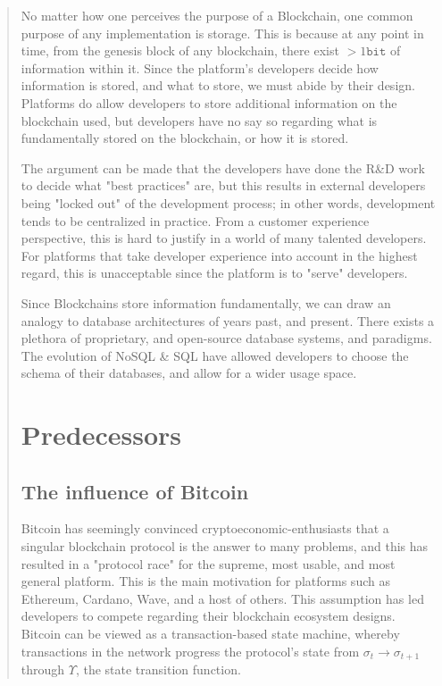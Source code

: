 \documentclass[12pt, titlepage, twocolumn]{report}
\begin{document}
\begin{quotation}
No matter how one perceives the purpose of a Blockchain, one common purpose of any implementation is storage. This is because at any point in time, from the genesis block of any blockchain, there exist \(> 1 \texttt{bit}\) of information within it. Since the platform's developers decide how information is stored, and what to store, we must abide by their design. Platforms do allow developers to store additional information on the blockchain used, but developers have no say so regarding what is fundamentally stored on the blockchain, or how it is stored. 

The argument can be made that the developers have done the R\&D work to decide what "best practices" are, but this results in external developers being "locked out" of the development process; in other words, development tends to be centralized in practice. From a customer experience perspective, this is hard to justify in a world of many talented developers. For platforms that take developer experience into account in the highest regard, this is unacceptable since the platform is to "serve" developers.

Since Blockchains store information fundamentally, we can draw an analogy to database architectures of years past, and present. There exists a plethora of proprietary, and open-source database systems, and paradigms. The evolution of NoSQL \& SQL have allowed developers to choose the schema of their databases, and allow for a wider usage space.

\chapter{Predecessors}

\section{The influence of Bitcoin}
Bitcoin has seemingly convinced cryptoeconomic-enthusiasts that a singular blockchain protocol is the answer to many problems, and this has resulted in a "protocol race" for the supreme, most usable, and most general platform. This is the main motivation for platforms such as Ethereum, Cardano, Wave, and a host of others. This assumption has led developers to compete regarding their blockchain ecosystem designs. Bitcoin can be viewed as a transaction-based state machine, whereby transactions in the network progress the protocol's state from \(\sigma_t \rightarrow \sigma_{t+1}\) through \(\Upsilon\), the state transition function.


\end{quotation}
\end{document}
